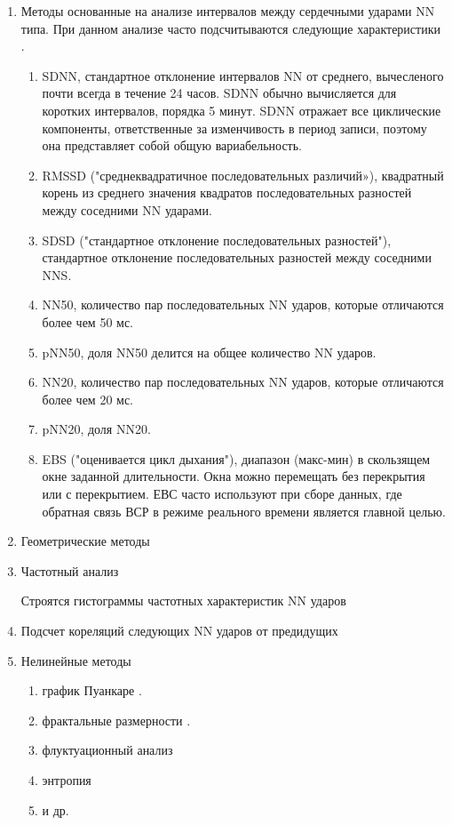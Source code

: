 \begin{enumerate}
	\item Методы основанные на анализе интервалов между сердечными ударами NN типа. При данном анализе часто подсчитываются следующие характеристики \cite{pNN, metric_of_hrv}.
	\begin{enumerate}
		\item SDNN, стандартное отклонение интервалов NN от среднего, вычесленого почти всегда в течение 24 часов. SDNN обычно вычисляется для коротких интервалов, порядка 5 минут. SDNN отражает все циклические компоненты, ответственные за изменчивость в период записи, поэтому она представляет собой общую вариабельность.
		\item 	RMSSD ("среднеквадратичное последовательных различий»), квадратный корень из среднего значения квадратов последовательных разностей между соседними NN ударами.
		\item SDSD ("стандартное отклонение последовательных разностей"), стандартное отклонение последовательных разностей между соседними NNS.
		\item NN50, количество пар последовательных NN ударов, которые отличаются более чем 50 мс.
		\item pNN50, доля NN50 делится на общее количество NN ударов.
		\item 	NN20, количество пар последовательных NN ударов, которые отличаются более чем 20 мс.
		\item pNN20, доля NN20.
		\item EBS ("оценивается цикл дыхания"), диапазон (макс-мин) в скользящем окне заданной длительности. Окна можно перемещать без перекрытия или с перекрытием. ЕВС часто используют при сборе данных, где обратная связь ВСР в режиме реального времени является главной целью.
	\end{enumerate}
	\item Геометрические методы \cite{geometric_metric}
	\item Частотный анализ
	
	Строятся гистограммы частотных характеристик NN ударов
	
	\item Подсчет кореляций следующих NN ударов от предидущих \cite{autocorr_metric}
	\item Нелинейные методы \cite{non_linear_metric}
	
	\begin{enumerate}
		\item график Пуанкаре \cite{poinkare_plot}.
		\item фрактальные размерности \cite{fractal_dim}.
		\item флуктуационный анализ \cite{fluct_analis}
		\item энтропия \cite{entropy1, entropy2, entropy3}
		\item и др. \cite{other_analis1, other_analis2, other_analis3}
	\end{enumerate}	
\end{enumerate}

